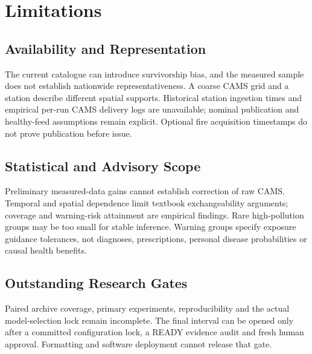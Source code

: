 \section{Limitations}
\subsection{Availability and Representation}
The current catalogue can introduce survivorship bias, and the measured sample
does not establish nationwide representativeness. A coarse CAMS grid and a
station describe different spatial supports. Historical station ingestion
times and empirical per-run CAMS delivery logs are unavailable; nominal
publication and healthy-feed assumptions remain explicit. Optional fire
acquisition timestamps do not prove publication before issue.

\subsection{Statistical and Advisory Scope}
Preliminary measured-data gains cannot establish correction of raw CAMS.
Temporal and spatial dependence limit textbook exchangeability arguments;
coverage and warning-risk attainment are empirical findings. Rare high-pollution
groups may be too small for stable inference. Warning groups specify exposure
guidance tolerances, not diagnoses, prescriptions, personal disease probabilities
or causal health benefits.

\subsection{Outstanding Research Gates}
Paired archive coverage, primary experiments, reproducibility and the actual
model-selection lock remain incomplete. The final interval can be opened only
after a committed configuration lock, a READY evidence audit and fresh human
approval. Formatting and software deployment cannot release that gate.
